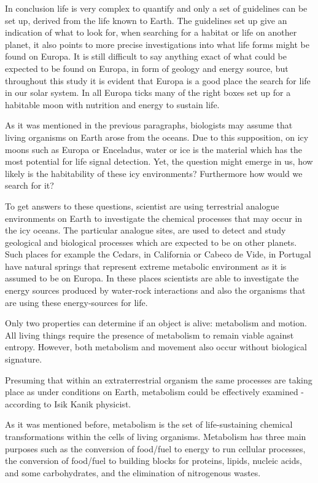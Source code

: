 In conclusion life is very complex to quantify and only a set of guidelines can be set up, derived from the life known to Earth. The guidelines set up give an indication of what to look for, when searching for a habitat or life on another planet, it also points to more precise investigations into what life forms might be found on Europa. It is still difficult to say anything exact of what could be expected to be found on Europa, in form of geology and energy source, but throughout this study it is evident that Europa is a good place the search for life in our solar system. In all Europa ticks many of the right boxes set up for a habitable moon with nutrition and energy to sustain life.

As it was mentioned in the previous paragraphs, biologists may assume that living organisms on Earth arose from the oceans. Due to this supposition, on icy moons such as Europa or Enceladus, water or ice is the material which has the most potential for life signal detection. Yet, the question might emerge in us, how likely is the habitability of these icy environments? Furthermore how would we search for it?

To get answers to these questions, scientist are using terrestrial analogue environments on Earth to investigate the chemical processes that may occur in the icy oceans. The particular analogue sites, are used to detect and study geological and biological processes which are expected to be on other planets. Such places for example the Cedars, in California or Cabeco de Vide, in Portugal have natural springs that represent extreme metabolic environment as it is assumed to be on Europa. In these places scientists are able to investigate the energy sources produced by water-rock interactions and also the organisms that are using these energy-sources for life.

Only two properties can determine if an object is alive:
metabolism and motion. All living things require the presence of metabolism to remain viable against entropy. However, both metabolism and movement also occur without biological signature.

Presuming that within an extraterrestrial organism the same processes are taking place as under conditions on Earth, metabolism could be effectively examined - according to Isik Kanik physicist.
\cite{astrobio}


As it was mentioned before, metabolism is the set of life-sustaining chemical transformations within the cells of living organisms. Metabolism has three main purposes such as the conversion of food/fuel to energy to run cellular processes, the conversion of food/fuel to building blocks for proteins, lipids, nucleic acids, and some carbohydrates, and the elimination of nitrogenous wastes.
\cite{wiki:metabolism}


